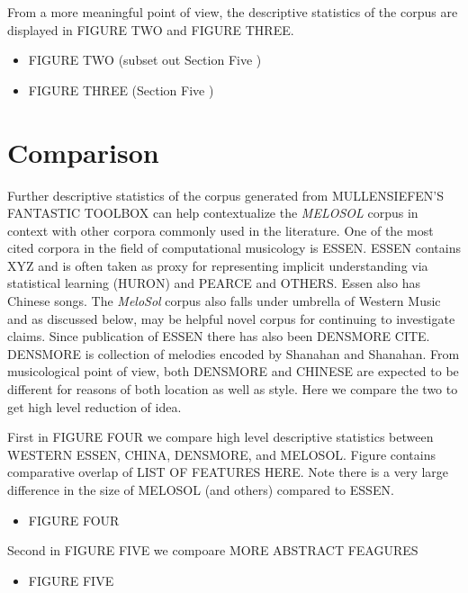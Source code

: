 \documentclass[english,man]{apa6}
\providecommand{\tightlist}{%
  \setlength{\itemsep}{0pt}\setlength{\parskip}{0pt}}
\begin{document}
From a more meaningful point of view, the descriptive statistics of the corpus are displayed in FIGURE TWO and FIGURE THREE.

\begin{itemize}
\tightlist
\item
  FIGURE TWO (subset out Section Five )
\item
  FIGURE THREE (Section Five )
\end{itemize}

\hypertarget{comparison}{%
\section{Comparison}\label{comparison}}

Further descriptive statistics of the corpus generated from MULLENSIEFEN'S FANTASTIC TOOLBOX can help contextualize the \emph{MELOSOL} corpus in context with other corpora commonly used in the literature.
One of the most cited corpora in the field of computational musicology is ESSEN.
ESSEN contains XYZ and is often taken as proxy for representing implicit understanding via statistical learning (HURON) and PEARCE and OTHERS.
Essen also has Chinese songs.
The \emph{MeloSol} corpus also falls under umbrella of Western Music and as discussed below, may be helpful novel corpus for continuing to investigate claims.
Since publication of ESSEN there has also been DENSMORE CITE.
DENSMORE is collection of melodies encoded by Shanahan and Shanahan.
From musicological point of view, both DENSMORE and CHINESE are expected to be different for reasons of both location as well as style.
Here we compare the two to get high level reduction of idea.

First in FIGURE FOUR we compare high level descriptive statistics between WESTERN ESSEN, CHINA, DENSMORE, and MELOSOL.
Figure contains comparative overlap of LIST OF FEATURES HERE.
Note there is a very large difference in the size of MELOSOL (and others) compared to ESSEN.

\begin{itemize}
\tightlist
\item
  FIGURE FOUR
\end{itemize}

Second in FIGURE FIVE we compoare MORE ABSTRACT FEAGURES

\begin{itemize}
\tightlist
\item
  FIGURE FIVE
\end{itemize}
\end{document}
